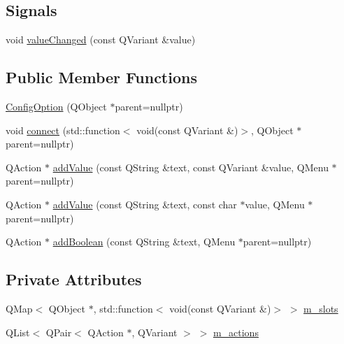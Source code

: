 \subsection*{Signals}
\begin{DoxyCompactItemize}
\item 
void \mbox{\hyperlink{class_q_g_b_a_1_1_config_option_af19ac25e7fffc39de4b2a0084d35d903}{value\+Changed}} (const Q\+Variant \&value)
\end{DoxyCompactItemize}
\subsection*{Public Member Functions}
\begin{DoxyCompactItemize}
\item 
\mbox{\hyperlink{class_q_g_b_a_1_1_config_option_a1e3ea0401910824c5522bba4664efaa3}{Config\+Option}} (Q\+Object $\ast$parent=nullptr)
\item 
void \mbox{\hyperlink{class_q_g_b_a_1_1_config_option_abe38d4d9dd27b673bc421a22456d478f}{connect}} (std\+::function$<$ void(const Q\+Variant \&)$>$, Q\+Object $\ast$parent=nullptr)
\item 
Q\+Action $\ast$ \mbox{\hyperlink{class_q_g_b_a_1_1_config_option_a037c85ff3f90cad9bfd8488d92d591d6}{add\+Value}} (const Q\+String \&text, const Q\+Variant \&value, Q\+Menu $\ast$parent=nullptr)
\item 
Q\+Action $\ast$ \mbox{\hyperlink{class_q_g_b_a_1_1_config_option_aa932ea9aff61b5a1d2800bbe6c94f8ed}{add\+Value}} (const Q\+String \&text, const char $\ast$value, Q\+Menu $\ast$parent=nullptr)
\item 
Q\+Action $\ast$ \mbox{\hyperlink{class_q_g_b_a_1_1_config_option_a98b612a797cd568294af1a19913297af}{add\+Boolean}} (const Q\+String \&text, Q\+Menu $\ast$parent=nullptr)
\end{DoxyCompactItemize}
\subsection*{Private Attributes}
\begin{DoxyCompactItemize}
\item 
Q\+Map$<$ Q\+Object $\ast$, std\+::function$<$ void(const Q\+Variant \&)$>$ $>$ \mbox{\hyperlink{class_q_g_b_a_1_1_config_option_a0950b5531e60fdf40af0211de0e46aca}{m\+\_\+slots}}
\item 
Q\+List$<$ Q\+Pair$<$ Q\+Action $\ast$, Q\+Variant $>$ $>$ \mbox{\hyperlink{class_q_g_b_a_1_1_config_option_a6fb9c60435e842f49f839daa65bea137}{m\+\_\+actions}}
\end{DoxyCompactItemize}


